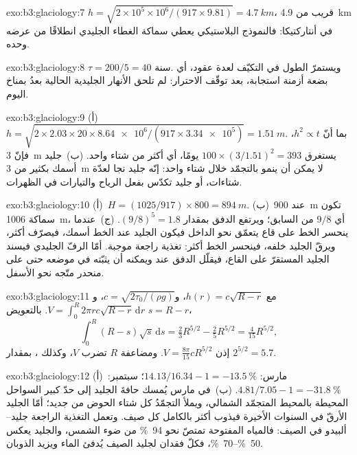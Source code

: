 \begin{solution}{exo:b3:glaciology:7}
$h = \sqrt{2\times10^5\times10^6/(917\times9.81)} = \qty{4.7}{km}$، قريب من
\qty{4.9}{km} في أنتاركتيكا: فالنموذج البلاستيكي يعطي سماكة الغطاء الجليدي
انطلاقًا من عرضه وحده.
\end{solution}

\begin{solution}{exo:b3:glaciology:8}
$\tau = 200/5 = \num{40}\text{ سنة}$. ويستمرّ الطول في التكيّف
لعدة عقود، أي بضعة أزمنة استجابة، بعد توقّف الاحترار: لم تلحق الأنهار
الجليدية الحالية بعدُ بمناخ اليوم.
\end{solution}

\begin{solution}{exo:b3:glaciology:9}
(أ)~$h = \sqrt{2\times2.03\times20\times\num{8.64e6}/(917\times\num{3.34e5})}
= \qty{1.51}{m}$. بما أنّ $h^2 \propto t$، فإنّ \qty{3}{m} يستغرق $100\times
(3/1.51)^2 = 393$ يومًا، أي أكثر من شتاء واحد. (ب)~جليد أسمك بكثير من
\qty{3}{m} لا يمكن أن ينمو بالتجمّد خلال شتاء واحد: إنّه جليد نجا
لعدّة شتاءات، أو جليد تكدّس بفعل الرياح والتيارات في الظهرات.
\end{solution}

\begin{solution}{exo:b3:glaciology:10}
(أ)~$H = (1025/917)\times800 = \qty{894}{m}$. (ب)~عند \qty{900}{m} تكون
سماكة  \qty{1006}{m}، أي $9/8$ من السابق؛ ويرتفع الدفق
بمقدار $(9/8)^5 = 1.8$. (ج)~عندما ينحسر الخط على قاع يتعمّق نحو الداخل
فيكون الجليد عند الخط أسمك، فيصرّف أكثر، ويرقّ الجليد
خلفه، فينحسر الخط أكثر: تغذية راجعة موجبة. أمّا الرفّ الجليدي
فيسند الجليد المستقرّ على القاع، فيقلّل الدفق عند  ويمكنه أن
يثبّته في موضعه حتى على منحدر متّجه نحو الأسفل.
\end{solution}

\begin{solution}{exo:b3:glaciology:11}
مع $h(r) = c\sqrt{R - r}$، و$c = \sqrt{2\tau_0/(\rho g)}$، و$V =
\int_0^R2\pi rc\sqrt{R - r}\,\mathrm dr$. بالتعويض $s = R - r$،
\[
\int_0^R(R - s)\sqrt s\,\mathrm ds = \tfrac23R^{5/2} - \tfrac25R^{5/2} =
\tfrac4{15}R^{5/2},
\]
إذن $V = \frac{8\pi}{15}cR^{5/2}$. ومضاعفة $R$
تضرب $V$، وكذلك ، بمقدار $2^{5/2} = 5.7$.
\end{solution}

\begin{solution}{exo:b3:glaciology:12}
(أ)~مارس: $14.13/16.34 - 1 = \qty{-13.5}{\percent}$؛ سبتمبر: $4.81/7.05
- 1 = \qty{-31.8}{\percent}$. (ب)~في مارس يُمسك حافةَ الجليد إلى حدّ كبير
السواحل المحيطة بالمحيط المتجمّد الشمالي، ويملأ التجمّدُ كل شتاء
الحوض من جديد؛ أمّا الجليد الأرقّ في السنوات الأخيرة فيذوب أكثر
بالكامل كل صيف. وتعمل التغذية الراجعة جليد--ألبيدو في الصيف: فالمياه
المفتوحة تمتصّ نحو \qty{94}{\percent} من ضوء الشمس، والجليد يعكس
\qtyrange{50}{70}{\percent}، فكلّ فقدان لجليد الصيف يُدفئ الماء ويزيد
الذوبان.
\end{solution}

